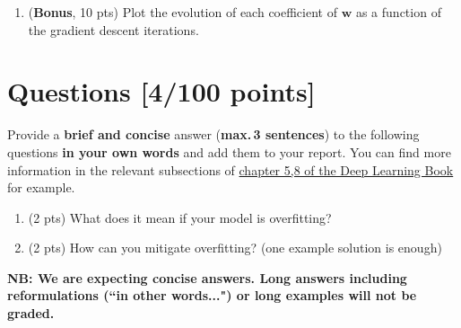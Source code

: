 \documentclass[a4paper,11pt]{article}
\begin{document}
\begin{enumerate}
\item (\textbf{Bonus}, 10 pts) Plot the evolution of each coefficient of $\mathbf{w}$ as a function of the gradient descent iterations.
\end{enumerate}


\section{Questions [4/100 points]}
Provide a \textbf{brief and concise} answer (\textbf{max.\,3 sentences}) to the following questions \textbf{in your own words} and add them to your report. You can find more information in the relevant subsections of \href{https://www.deeplearningbook.org/}{chapter 5,8 of the Deep Learning Book} for example.  
\begin{enumerate}
\item (2 pts) What does it mean if your model is overfitting?
\item (2 pts) How can you mitigate overfitting? (one example solution is enough)
\end{enumerate}
\textbf{NB: We are expecting concise answers.
Long answers including reformulations (``in other words...") or long examples
will not be graded.}
\end{document}
